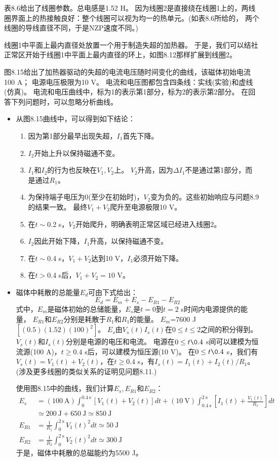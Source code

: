 表8.6给出了线圈参数。总电感是1.52 H。
因为线圈2是直接绕在线圈1上的，两线圈界面上的热接触良好：整个线圈可以视为均一的热单元。(如表8.6所给的，
两个线圈的导线直径不同，于是NZP速度不同。)

线圈1中平面上最内直径处放置一个用于制造失超的加热器。
于是，我们可以结社正常区开始于线圈1中平面上最内直径的环上，如图8.12那样扩展到线圈2。

图8.15给出了加热器驱动的失超的电流电压随时间变化的曲线，该磁体初始电流100 A；
电源电压极限为10 V。
电流和电压图都包含四条线：实线(实验)和虚线(仿真)。
电流和电压曲线中，标为1的表示第1部分，标为2的表示第2部分。
在回答下列问题时，可以忽略分析曲线。

\begin{itemize}
\item 从图8.15曲线中，可以得到如下结论：
	\begin{enumerate}
		\item  因为第1部分最早出现失超，$I_1$首先下降。
		\item $I_2$开始上升以保持磁通不变。
		\item $I_1$和$I_2$的行为也反映在$V_1,V_2$上。
		$V_2$升高，因为$\Delta I_1$不是通过第1部分，而是通过$R_1$。
		\item 为保持端子电压为0(至少在初始时)，$V_2$变为负的。这些初始响应与问题8.9的结果一致。
		最终$V_1+V_2$爬升至电源极限10 V。
		\item 在$t\sim$0.2 s，$V_2$开始爬升，明确表明正常区域已经进入线圈2。
		\item $I_2$因此开始下降，$I_1$升高，以保持磁通不变。
		\item 在$t\sim$0.4 s，$V_1+V_2$达到10 V，$I_1$必须开始下降。
		\item 在$t>$0.4 s后，$V_1+V_2=10$ V。
	\end{enumerate}
\item 磁体中耗散的总能量$E_d$可由下式给出：
\begin{equation}%
E_d=E_m+E_s-E_{R1}-E_{R2}
\end{equation}
式中，$E_m$是磁体初始的总储能量，$E_s$是$t=0$到$t=2$ s时间内电源提供的能量，
$E_{R1}$和$E_{R2}$分别是耗散于$R_1$和$R_1$的能量。
$E_m$=7600 J$[(0.5)(1.52)(100)^2]$。
$E_s$由$V_s(t)I_s(t)$在$0\le t\le 2$之间的积分得到。
$V_s(t)$和$I_s(t)$分别是电源的电压和电流。
电源在$0\le t\0.4$ s间可以建模为恒流源(100 A)，$t\ge 0.4$ s后，可以建模为恒压源(10 V)。
在$0\le t\0.4$ s，我们有$V_s(t)=V_1(t)+V_2(t)$，在$t\ge 0.4$ s，有$I_s(t)=I_1(t)+I_2(t)/R_1$。
(涉及更多线圈的类似关系的证明见问题8.11.)

使用图8.15中的曲线，我们计算$E_s,E_{R1}$和$E_{R2}$：
\begin{align*}
E_s&=(100\ \mathrm{A})\int_{0}^{0.4\ \mathrm{s}}[V_1(t)+V_2(t)]dt+(10\ \mathrm{V})\int_{0.4\ \mathrm{s}}^{2\ \mathrm{s}}\left[I_1(t)+\frac{V_1(t)}{R_1}\right]dt \\
&\simeq 200\ \mathrm{J}+650\ \mathrm{J}\simeq 850\ \mathrm{J}\\
E_{R1}&=\frac{1}{R_1}\int_{0}^{2\ \mathrm{s}}V_1(t)^2dt\simeq 50\ \mathrm{J} \\
E_{R2}&=\frac{1}{R_2}\int_{0}^{2\ \mathrm{s}}V_2(t)^2dt\simeq 300\ \mathrm{J}
\end{align*}
于是，磁体中耗散的总磁能约为5500 J。


\end{itemize}
